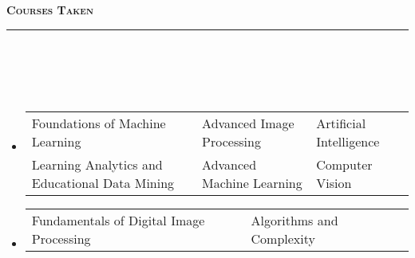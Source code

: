\documentclass[a4paper,10pt]{article}
\newcommand{\lsep}{-0.5cm}
\newcommand{\resheading}[1]{{\small
        {
            \begin{minipage}
                {0.992\textwidth}\textbf{{\textsc{#1 \vphantom{p\^{E}} }}}
                \\[-0.3cm]
                \hrule
            \end{minipage}
            \\[-0.5cm]
        }
 }}
\begin{document}
\resheading{\textbf{\large Courses Taken }}\\[\lsep]
\\[-0.2cm]
\begin{itemize}
    \item[] \begin{tabular}{p{8cm}p{5cm}l }
    Foundations of Machine Learning & Advanced Image Processing  & Artificial Intelligence\\ 
    Learning Analytics and Educational Data Mining & Advanced Machine Learning   &  Computer Vision
    \end{tabular}
    \vspace{-0.25cm}
    \item[] \begin{tabular}{p{8cm}p{5cm}l }
    Fundamentals of Digital Image Processing & Algorithms and Complexity
    \end{tabular}
\end{itemize}
\end{document}
